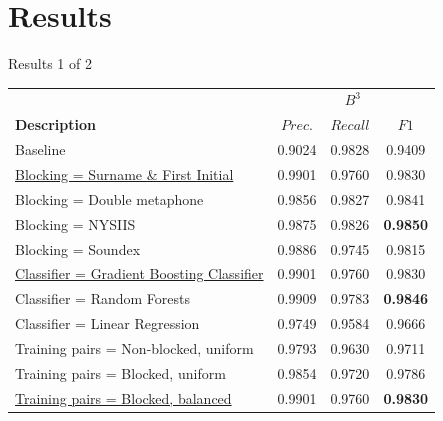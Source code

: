 \documentclass{beamer}
\begin{document}


\section{Results}

\begin{frame}{Results 1 of 2}




\begin{table}
\centering
\begin{tabular}{|l|c c c |}
  \hline
                       & \multicolumn{3}{|c|}{\textbf{$B^{3}$}}\\
  \textbf{Description} & $Prec.$ & $Recall$ & $F1$ \\
  \hline
  \hline
Baseline & 0.9024 & 0.9828 & 0.9409  \\
\hline
\underline{Blocking = Surname \& First Initial} & 0.9901 & 0.9760 & 0.9830  \\
Blocking = Double metaphone & 0.9856 & 0.9827 & 0.9841  \\
Blocking = NYSIIS & 0.9875 & 0.9826 & \textbf{0.9850}   \\
Blocking = Soundex & 0.9886 & 0.9745 & 0.9815  \\
\hline
\underline{Classifier = Gradient Boosting Classifier} & 0.9901 & 0.9760 & 0.9830   \\
Classifier = Random Forests & 0.9909 & 0.9783 & \textbf{0.9846}  \\
Classifier = Linear Regression & 0.9749 & 0.9584 & 0.9666 \\
\hline
Training pairs = Non-blocked, uniform & 0.9793 & 0.9630 & 0.9711   \\
Training pairs = Blocked, uniform & 0.9854 & 0.9720 & 0.9786   \\
\underline{Training pairs = Blocked, balanced} & 0.9901 & 0.9760 & \textbf{0.9830}  \\
\hline

\end{tabular}
\end{table}

\end{frame}
\end{document}
